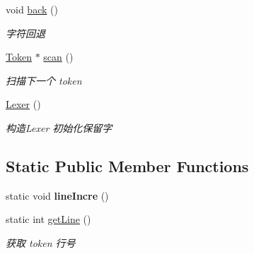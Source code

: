 \begin{DoxyCompactItemize}
void \hyperlink{class_lexer_ae28380e5c67144a1aeaf37f33ab11fb2}{back} ()
\begin{DoxyCompactList}\small\item\em 字符回退 \end{DoxyCompactList}\item 
\hyperlink{class_token}{Token} $\ast$ \hyperlink{class_lexer_a2085b8262f6237de60583375ee2731f4}{scan} ()
\begin{DoxyCompactList}\small\item\em 扫描下一个 token \end{DoxyCompactList}\item 
\mbox{\label{class_lexer_a2752a2b16cc1ffbcb8fc3e82e95bf331}} 
\hyperlink{class_lexer_a2752a2b16cc1ffbcb8fc3e82e95bf331}{Lexer} ()
\begin{DoxyCompactList}\small\item\em 构造\+Lexer 初始化保留字 \end{DoxyCompactList}\end{DoxyCompactItemize}
\subsection*{Static Public Member Functions}
\begin{DoxyCompactItemize}
\item 
\mbox{\label{class_lexer_a48478c1d6556ce949e7808bf3e2604b7}} 
static void {\bfseries line\+Incre} ()
\item 
\mbox{\label{class_lexer_a0ede40225695d9eb9b42d275584cf8f0}} 
static int \hyperlink{class_lexer_a0ede40225695d9eb9b42d275584cf8f0}{get\+Line} ()
\begin{DoxyCompactList}\small\item\em 获取 token 行号 \end{DoxyCompactList}\end{DoxyCompactItemize}
